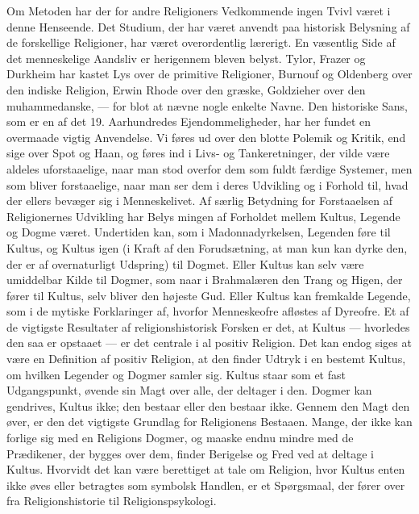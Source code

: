 \documentclass[12pt,a4paper,openany]{book}
\newcommand{\opage}[1]{\marginnote{\footnotesize\textit{[#1]}}}
\begin{document}
Om Metoden har der for andre Religioners Vedkommende ingen
Tvivl været i denne Henseende. Det Studium, der har været anvendt
paa historisk Belysning af de forskellige Religioner, har været overordentlig
lærerigt. En væsentlig Side af det menneskelige Aandsliv
er herigennem bleven belyst. Tylor, Frazer og Durkheim har kastet
Lys over de primitive Religioner, Burnouf og Oldenberg over den
indiske Religion, Erwin Rhode over den græske, Goldzieher over den
muhammedanske, --- for blot at nævne nogle enkelte Navne. Den
historiske Sans, som er en af det 19. Aarhundredes Ejendommeligheder,
har her fundet en overmaade vigtig Anvendelse. Vi føres ud
over den blotte Polemik og Kritik, end sige over Spot og Haan, og
føres ind i Livs- og Tankeretninger, der vilde være aldeles uforstaaelige,
naar man stod overfor dem som fuldt færdige Systemer, men
som bliver forstaaelige, naar man ser dem i deres Udvikling og i
Forhold til, hvad der ellers bevæger sig i Menneskelivet. Af særlig
Betydning for Forstaaelsen af Religionernes Udvikling har Belys%
\opage{132}mingen af Forholdet mellem Kultus, Legende og Dogme været. Undertiden
kan, som i Madonnadyrkelsen, Legenden føre til Kultus,
og Kultus igen (i Kraft af den Forudsætning, at man kun kan dyrke
den, der er af overnaturligt Udspring) til Dogmet. Eller Kultus kan
selv være umiddelbar Kilde til Dogmer, som naar i Brahmalæren
den Trang og Higen, der fører til Kultus, selv bliver den højeste
Gud. Eller Kultus kan fremkalde Legende, som i de mytiske Forklaringer
af, hvorfor Menneskeofre afløstes af Dyreofre. Et af de
vigtigste Resultater af religionshistorisk Forsken er det, at Kultus
--- hvorledes den saa er opstaaet --- er det centrale i al positiv Religion.
Det kan endog siges at være en Definition af positiv Religion,
at den finder Udtryk i en bestemt Kultus, om hvilken Legender og
Dogmer samler sig. Kultus staar som et fast Udgangspunkt, øvende
sin Magt over alle, der deltager i den. Dogmer kan gendrives, Kultus
ikke; den bestaar eller den bestaar ikke. Gennem den Magt den øver,
er den det vigtigste Grundlag for Religionens Bestaaen. Mange, der
ikke kan forlige sig med en Religions Dogmer, og maaske endnu
mindre med de Prædikener, der bygges over dem, finder Berigelse
og Fred ved at deltage i Kultus. Hvorvidt det kan være berettiget at
tale om Religion, hvor Kultus enten ikke øves eller betragtes som
symbolsk Handlen, er et Spørgsmaal, der fører over fra Religionshistorie
til Religionspsykologi.
\end{document}
